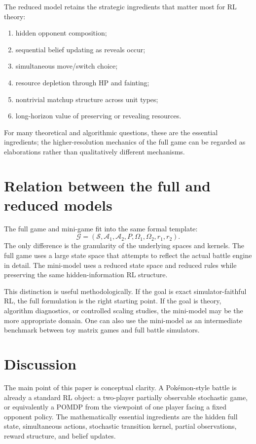 \documentclass[aps,pre,twocolumn,superscriptaddress,nofootinbib]{revtex4-2}
\newcommand{\cS}{\mathcal{S}}
\newcommand{\cA}{\mathcal{A}}
\newcommand{\cG}{\mathcal{G}}
\theoremstyle{definition}
\theoremstyle{plain}
\begin{document}
The reduced model retains the strategic ingredients that matter most for RL theory:
\begin{enumerate}
    \item hidden opponent composition;
    \item sequential belief updating as reveals occur;
    \item simultaneous move/switch choice;
    \item resource depletion through HP and fainting;
    \item nontrivial matchup structure across unit types;
    \item long-horizon value of preserving or revealing resources.
\end{enumerate}
For many theoretical and algorithmic questions, these are the essential ingredients; the higher-resolution mechanics of the full game can be regarded as elaborations rather than qualitatively different mechanisms.

\section{Relation between the full and reduced models}
\label{sec:relation}

The full game and mini-game fit into the same formal template:
\begin{equation}
    \cG = (\cS,\cA_1,\cA_2,P,\Omega_1,\Omega_2,r_1,r_2).
\end{equation}
The only difference is the granularity of the underlying spaces and kernels. The full game uses a large state space that attempts to reflect the actual battle engine in detail. The mini-model uses a reduced state space and reduced rules while preserving the same hidden-information RL structure.

This distinction is useful methodologically. If the goal is exact simulator-faithful RL, the full formulation is the right starting point. If the goal is theory, algorithm diagnostics, or controlled scaling studies, the mini-model may be the more appropriate domain. One can also use the mini-model as an intermediate benchmark between toy matrix games and full battle simulators.

\section{Discussion}
\label{sec:discussion}

The main point of this paper is conceptual clarity. A Pok\'emon-style battle is already a standard RL object: a two-player partially observable stochastic game, or equivalently a POMDP from the viewpoint of one player facing a fixed opponent policy. The mathematically essential ingredients are the hidden full state, simultaneous actions, stochastic transition kernel, partial observations, reward structure, and belief updates.
\end{document}
